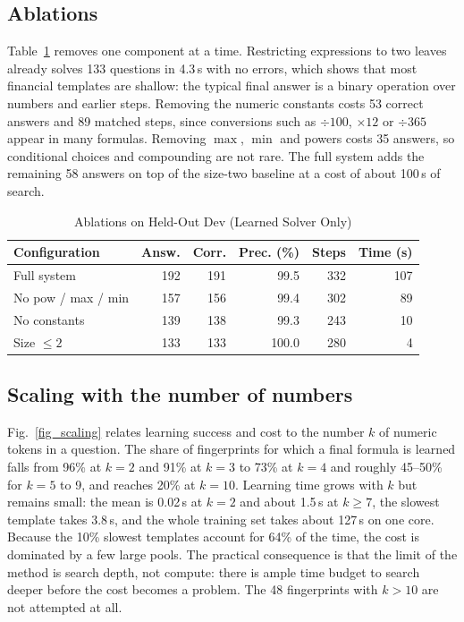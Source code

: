 \documentclass[conference]{IEEEtran}
\begin{document}
\subsection{Ablations}
Table~\ref{tab_ablation} removes one component at a time. Restricting expressions to two leaves already solves 133 questions in
4.3\,s with no errors, which shows that most financial templates are shallow:
the typical final answer is a binary operation over numbers and earlier steps.
Removing the numeric constants costs 53 correct answers and 89 matched steps,
since conversions such as $\div 100$, $\times 12$ or $\div 365$ appear in many
formulas. Removing $\max$, $\min$ and powers costs 35 answers, so conditional
choices and compounding are not rare. The full system adds the remaining 58
answers on top of the size-two baseline at a cost of about 100\,s of search.

\begin{table}[!t]
\renewcommand{\arraystretch}{1.25}
\caption{Ablations on Held-Out Dev (Learned Solver Only)}
\label{tab_ablation}
\centering
\setlength{\tabcolsep}{4pt}
\begin{tabular}{lrrrrr}
\hline
\bfseries Configuration & \bfseries Answ. & \bfseries Corr. & \bfseries Prec. (\%) & \bfseries Steps & \bfseries Time (s)\\
\hline\hline
Full system & 192 & 191 & 99.5 & 332 & 107\\
No pow / max / min & 157 & 156 & 99.4 & 302 & 89\\
No constants & 139 & 138 & 99.3 & 243 & 10\\
Size $\leq 2$ & 133 & 133 & 100.0 & 280 & 4\\
\hline
\end{tabular}
\end{table}

\subsection{Scaling with the number of numbers}
Fig.~\ref{fig_scaling} relates learning success and cost to the number $k$ of
numeric tokens in a question. The share of fingerprints for which a final
formula is learned falls from 96\% at $k=2$ and 91\% at $k=3$ to 73\% at
$k=4$ and roughly 45--50\% for $k=5$ to 9, and reaches 20\% at $k=10$. Learning
time grows with $k$ but remains small: the mean is 0.02\,s at $k=2$ and about
1.5\,s at $k\ge 7$, the slowest template takes 3.8\,s, and the whole training
set takes about 127\,s on one core. Because the 10\% slowest templates account
for 64\% of the time, the cost is dominated by a few large pools. The practical
consequence is that the limit of the method is search depth, not compute: there
is ample time budget to search deeper before the cost becomes a problem. The
48 fingerprints with $k>10$ are not attempted at all.
\end{document}
